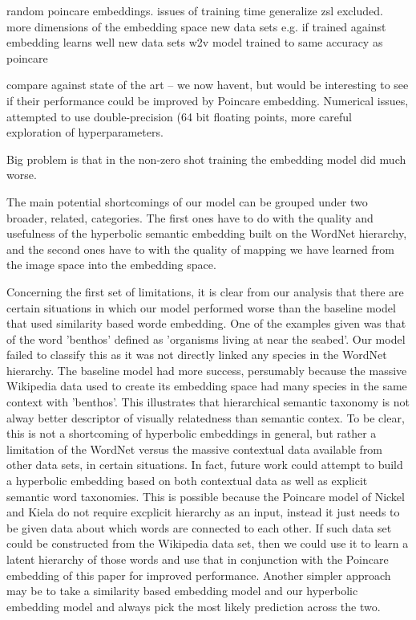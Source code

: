 \documentclass[12pt]{report}
\begin{document}
random poincare embeddings.
issues of training time
generalize zsl excluded.
more dimensions of the embedding space
new data sets e.g. if trained against embedding learns well new data sets
w2v model trained to same accuracy as poincare  

compare against state of the art -- we now havent, but would be interesting to see if their performance could be improved by Poincare embedding.
Numerical issues, attempted to use double-precision (64 bit floating points, more careful exploration of hyperparameters.












Big problem is that in the non-zero shot training the embedding model did much worse.

The main potential shortcomings of our model can be grouped under two broader, related, categories. The first ones have to do with the quality and usefulness of the hyperbolic semantic embedding built on the WordNet hierarchy, and the second ones have to with the quality of mapping we have learned from the image space into the embedding space.

Concerning the first set of limitations, it is clear from our analysis that there are certain situations in which our model performed worse than the baseline model that used similarity based worde embedding. One of the examples given was that of the word 'benthos' defined as 'organisms living at near the seabed'. Our model failed to classify this as it was not directly linked any species in the WordNet hierarchy. The baseline model had more success, persumably because the massive Wikipedia data used to create its embedding space had many species in the same context with 'benthos'. This illustrates that hierarchical semantic taxonomy is not alway better descriptor of visually relatedness than semantic contex. To be clear, this is not a shortcoming of hyperbolic embeddings in general, but rather a limitation of the WordNet versus the massive contextual data available from other data sets, in certain situations. In fact, future work could attempt to build a hyperbolic embedding based on both contextual data as well as explicit semantic word taxonomies. This is possible because the Poincare model of Nickel and Kiela \cite{Nickel2018} do not require excplicit hierarchy as an input, instead it just needs to be given data about which words are connected to each other. If such data set could be constructed from the Wikipedia data set, then we could use it to learn a latent hierarchy of those words and use that in conjunction with the Poincare embedding of this paper for improved performance. Another simpler approach may be to take a similarity based embedding model and our hyperbolic embedding model and always pick the most likely prediction across the two. 
\end{document}
